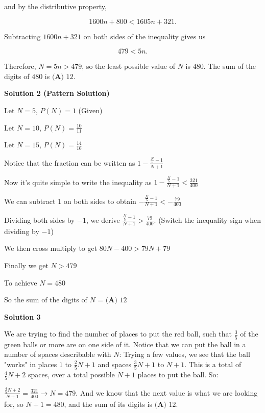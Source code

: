 \begin{enumerate}
 and by the distributive property,

 
 \[1600n+800<1605n+321.\]

 Subtracting $1600n+321$ on both sides of the inequality gives us

 
 \[479<5n.\]

 Therefore, $N=5n>479$, so the least possible value of $N$ is $480$. The sum of the digits of $480$ is $\boxed{\textbf{(A) } 12}$.

 



\textbf{Solution 2 (Pattern Solution)}

Let $N=5$, $P(N)=1$ (Given)

 
Let $N=10$, $P(N)=\frac{10}{11}$

 
Let $N=15$, $P(N)=\frac{14}{16}$

 
Notice that the fraction can be written as $1-\frac{\frac{N}{5}-1}{N+1}$

 Now it's quite simple to write the inequality as $1-\frac{\frac{N}{5}-1}{N+1}<\frac{321}{400}$

 We can subtract $1$ on both sides to obtain $-\frac{\frac{N}{5}-1}{N+1}<-\frac{79}{400}$

 Dividing both sides by $-1$, we derive $\frac{\frac{N}{5}-1}{N+1}>\frac{79}{400}$. (Switch the inequality sign when dividing by $-1$)

 We then cross multiply to get $80N - 400 > 79N + 79$

 Finally we get $N > 479$

 To achieve $N = 480$

 So the sum of the digits of $N$ = $\boxed{\textbf{(A) } 12}$




\textbf{Solution 3}

We are trying to find the number of places to put the red ball, such that $\frac{3}{5}$ of the green balls or more are on one side of it. Notice that we can put the ball in a number of spaces describable with $N$: Trying a few values, we see that the ball "works" in places $1$ to $\frac{2}{5}N + 1$ and spaces $\frac{3}{5}N+1$ to $N+1$. This is a total of $\frac{4}{5}N + 2$ spaces, over a total possible $N + 1$ places to put the ball. So:

 $\frac{\frac{4}{5}N + 2}{N+1} = \frac{321}{400} \rightarrow N = 479.$ And we know that the next value is what we are looking for, so $N+1 = 480$, and the sum of its digits is $\boxed{\textbf{(A) } 12}$.

 



\end{enumerate}
